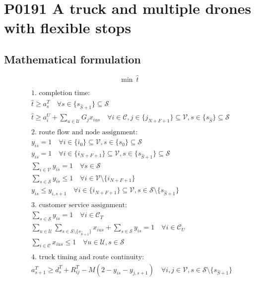 \documentclass[10pt]{article}
\begin{document}
\section*{P0191 A truck and multiple drones with flexible stops}
\subsection*{Mathematical formulation}
\[\min\ \hat t\]

\[\begin{aligned}
&\text{1. completion time:} \\
&\hat{t} \ge a^T_s \quad \forall s \in \{s_{\hat{S}+1}\} \subseteq \mathcal{S} \\
&\hat{t} \ge a^U_i + \sum_{u \in \mathcal{U}} G_j x_{ius} \quad \forall i \in \mathcal{C}, j \in \{j_{N+F+1}\} \subseteq \mathcal{V}, s \in \{s_{\hat{S}}\} \subseteq \mathcal{S} \\
\\
&\text{2. route flow and node assignment:} \\
&y_{is} = 1 \quad \forall i \in \{i_0\} \subseteq \mathcal{V}, s \in \{s_0\} \subseteq \mathcal{S} \\
&y_{is} = 1 \quad \forall i \in \{i_{N+F+1}\} \subseteq \mathcal{V}, s \in \{s_{\hat{S}+1}\} \subseteq \mathcal{S} \\
&\sum_{i \in \mathcal{V}} y_{is} = 1 \quad \forall s \in \mathcal{S} \\
&\sum_{s \in \mathcal{S}} y_{is} \le 1 \quad \forall i \in \mathcal{V} \setminus \{i_{N+F+1}\} \\
&y_{is} \le y_{i,s+1} \quad \forall i \in \{i_{N+F+1}\} \subseteq \mathcal{V}, s \in \mathcal{S} \setminus \{s_{\hat{S}+1}\} \\
\\
&\text{3. customer service assignment:} \\
&\sum_{s \in \mathcal{S}} y_{is} = 1 \quad \forall i \in \mathcal{C}_T \\
&\sum_{u \in \mathcal{U}} \sum_{s \in \mathcal{S} \setminus \{s_{\hat{S}+1}\}} x_{ius} + \sum_{s \in \mathcal{S}} y_{is} = 1 \quad \forall i \in \mathcal{C}_U \\
&\sum_{i \in \mathcal{C}} x_{ius} \le 1 \quad \forall u \in \mathcal{U}, s \in \mathcal{S} \\
\\
&\text{4. truck timing and route continuity:} \\
&a^T_{s+1} \ge d^T_s + R^T_{ij} - M(2 - y_{is} - y_{j,s+1}) \quad \forall i, j \in \mathcal{V}, s \in \mathcal{S} \setminus \{s_{\hat{S}+1}\} \\

\end{aligned}\]
\end{document}
